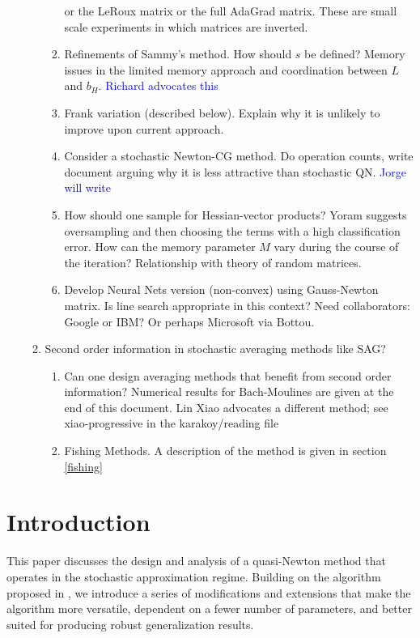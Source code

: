 \documentclass[12pt]{article}
\begin{document}
\begin{enumerate}
\begin{enumerate}
\begin{enumerate}
		         or the LeRoux matrix or the
		         full AdaGrad matrix.
		         These are small scale experiments in which matrices are inverted.
		\item  Refinements of Sammy's method. How should $s$ be defined?
		          Memory issues in the limited memory approach and  coordination between $L$ and $b_H$.
		          \textcolor{blue}{Richard advocates this}
		\item Frank variation (described below). Explain why it is unlikely to improve upon current approach.
		\item Consider a stochastic Newton-CG method. Do operation counts, write document arguing why
		         it is less attractive than stochastic QN. \textcolor{blue}{Jorge will write}
		\item How should one sample for Hessian-vector products? Yoram suggests oversampling and then
		         choosing the terms with a high classification error. How can the memory parameter $M$ vary during
		         the course of the iteration? Relationship with theory of random matrices.
		 \item Develop Neural Nets version (non-convex) using Gauss-Newton matrix. Is line search appropriate
		          in this context? Need collaborators: Google or IBM? Or perhaps Microsoft via Bottou.
     \end{enumerate}  
     \item Second order information in stochastic averaging methods like SAG?
	\begin{enumerate}
	\item Can one design averaging methods that benefit from second order information? 
	  Numerical results for Bach-Moulines are given at the end of this document. Lin Xiao advocates a different method; see 
	         xiao-progressive in the karakoy/reading file
	         	 \item Fishing Methods. A description of the method is given in section \ref{fishing}
	 	\end{enumerate}   
\end{enumerate}
\end{enumerate}



\section{Introduction}
\label{formulation}

This paper discusses the design and analysis of  a quasi-Newton method that operates in
the stochastic approximation regime. Building on the  algorithm proposed in \cite{sammy}, we introduce a 
series of modifications and extensions that make the algorithm more versatile, dependent on a fewer number of
parameters, and better suited for producing robust generalization results.
\end{document}
